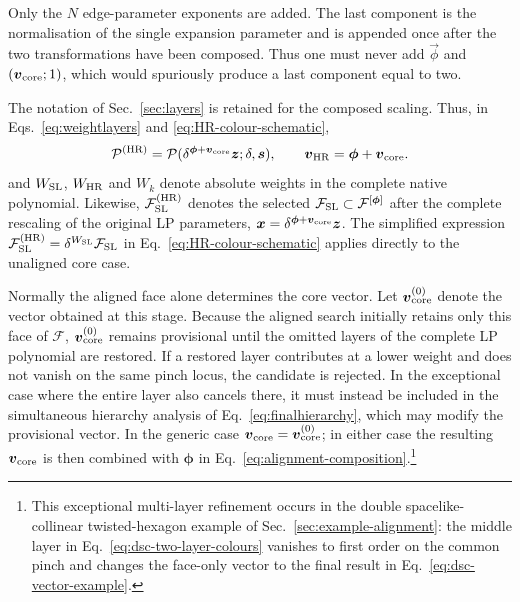 \documentclass[a4paper,11pt]{article}
\newcommand{\x}{\boldsymbol{x}}
\newcommand{\s}{\boldsymbol{s}}
\newcommand{\HR}{\mathrm{HR}}
\newcommand{\FSL}{\mathcal F_{\rm SL}}
\newcommand{\WSL}{W_{\rm SL}}
\newcommand{\WHR}{W_{\rm HR}}
\begin{document}
Only the \(N\) edge-parameter exponents are added.  The last component is the
normalisation of the single expansion parameter and is appended once after
the two transformations have been composed.  Thus one must never add
\(\vec\phi\) and \((\boldsymbol v_{\rm core};1)\), which would spuriously
produce a last component equal to two.

The notation of Sec.~\ref{sec:layers} is retained for the composed scaling.
Thus, in Eqs.~\eqref{eq:weightlayers} and \eqref{eq:HR-colour-schematic},
\begin{equation}
 \mathcal P^{(\HR)}
 =\mathcal P(\delta^{\boldsymbol\phi+\boldsymbol v_{\rm core}}\boldsymbol z;
             \delta,\s),
 \qquad
 \boldsymbol v_{\HR}=\boldsymbol\phi+\boldsymbol v_{\rm core}.
 \label{eq:composed-LP-rescaling}
\end{equation}
and \(\WSL\), \(\WHR\) and \(W_k\) denote absolute weights in the complete
native polynomial.  Likewise, \(\FSL^{(\HR)}\) denotes the selected
\(\FSL\subset\mathcal F^{[\boldsymbol\phi]}\) after the complete rescaling of
the original LP parameters,
\(\x=\delta^{\boldsymbol\phi+\boldsymbol v_{\rm core}}\boldsymbol z\).  The simplified expression
\(\FSL^{(\HR)}=\delta^{\WSL}\FSL\) in
Eq.~\eqref{eq:HR-colour-schematic} applies directly to the unaligned core
case.

Normally the aligned face alone determines the core vector.  Let
\(\boldsymbol v_{\rm core}^{(0)}\) denote the vector obtained at this stage.  Because
the aligned search initially retains only this face of \(\mathcal F\),
\(\boldsymbol v_{\rm core}^{(0)}\) remains provisional until the omitted layers of the
complete LP polynomial are restored.  If a restored layer
contributes at a lower weight and does not vanish on the same pinch locus,
the candidate is rejected.  In the exceptional case where the entire layer
also cancels there, it must instead be included in the simultaneous hierarchy
analysis of Eq.~\eqref{eq:finalhierarchy}, which may modify the provisional
vector.  In the generic case
\(\boldsymbol v_{\rm core}=\boldsymbol v_{\rm core}^{(0)}\); in either case
the resulting \(\boldsymbol v_{\rm core}\) is then combined with
\(\boldsymbol\phi\) in
Eq.~\eqref{eq:alignment-composition}.\footnote{This exceptional multi-layer
refinement occurs in the double spacelike-collinear twisted-hexagon example
of Sec.~\ref{sec:example-alignment}: the middle layer in
Eq.~\eqref{eq:dsc-two-layer-colours} vanishes to first order on the common
pinch and changes the face-only vector to the final result in
Eq.~\eqref{eq:dsc-vector-example}.}
\end{document}
